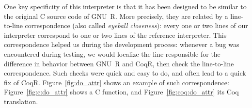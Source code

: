 \documentclass[
    sigplan,
    10pt,
    review, %
    natbib=false %
 ]{acmart}
\begin{document}
One key specificity of this interpreter is that it has been designed
to be similar to the original C source code of GNU~R.
More precisely, they are related by a line-to-line correspondence
(also called \emph{eyeball closeness}):
every one or two lines of our interpreter
correspond to one or two lines of the reference interpreter.
%
This correspondence helped us during the development process:
whenever a bug was encountered during testing,
we would localize the line responsible for the difference in behavior
between GNU~R and CoqR,
then check the line-to-line correspondence.
Such checks were quick and easy to do,
and often lead to a quick fix of CoqR.
%
Figure~\ref{fig:do_attr} shows an example of such correspondence:
Figure~\ref{fig:c:do_attr} shows a C function,
and Figure~\ref{fig:coq:do_attr} its Coq translation.
\end{document}
